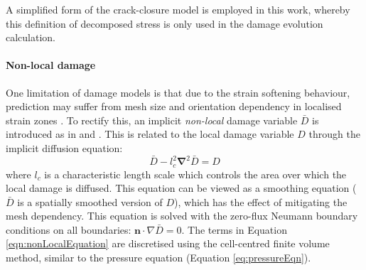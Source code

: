 \documentclass[sn-mathphys,Numbered,draft]{sn-jnl}%
\newcommand{\bb}{\boldsymbol}
\begin{document}
A simplified form of the crack-closure model \cite{teixeira_ductile_2010} is employed in this work, whereby this definition of decomposed stress is only used in the damage evolution calculation. 






\paragraph{Non-local damage}


One limitation of damage models is that due to the strain softening behaviour, prediction may suffer from mesh size and orientation dependency in localised strain zones \cite{peerlings_critical_2001, peerlings_localisation_2002, geers_strongly_2003}.
To rectify this, an implicit \emph{non-local} damage variable $\bar{D}$ is introduced as in \citet{peerlings_critical_2001, peerlings_localisation_2002} and \citet{geers_strongly_2003}.
This is related to the local damage variable $D$ through the implicit diffusion equation:
\begin{equation} \label{eqn:nonLocalEquation}
	\bar{D} -  l_c^2 \bb{\nabla}^2 \bar{D} = D
\end{equation}
where $l_c$ is a characteristic length scale which controls the area over which the local damage is diffused.
This equation can be viewed as a smoothing equation ($\bar{D}$ is a spatially smoothed version of $D$), which has the effect of mitigating the mesh dependency. This equation is solved with the zero-flux Neumann boundary conditions on all boundaries:  $\bb{n} \cdot \nabla \bar{D} = 0$.
The terms in Equation \ref{eqn:nonLocalEquation} are discretised using the cell-centred finite volume method, similar to the pressure equation (Equation \ref{eq:pressureEqn}).
\end{document}
